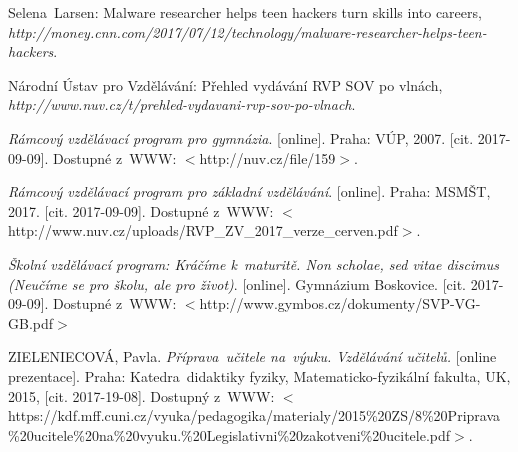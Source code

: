 \documentclass[a4paper, 12pt]{article}
\begin{document}
\newpage
\begin{thebibliography}{9}

    Selena~Larsen: Malware researcher helps teen hackers turn skills into careers,
    \\\textit{http://money.cnn.com/2017/07/12/technology/malware-researcher-helps-teen-hackers}.

    Národní Ústav pro Vzdělávání: Přehled vydávání RVP SOV po vlnách,
    \\\textit{http://www.nuv.cz/t/prehled-vydavani-rvp-sov-po-vlnach}.

    \textit{Rámcový vzdělávací program pro gymnázia}. [online]. Praha: VÚP, 2007. [cit. 2017-09-09]. Dostupné z~WWW: $<$http://nuv.cz/file/159$>$.

    \textit{Rámcový vzdělávací program pro základní vzdělávání}. [online]. Praha: MSMŠT, 2017. [cit. 2017-09-09]. Dostupné z~WWW: $<$http://www.nuv.cz/uploads/RVP\_ZV\_2017\_verze\_cerven.pdf$>$.

    \textit{Školní vzdělávací program: Kráčíme k~maturitě. Non scholae, sed vitae discimus (Neučíme se pro školu, ale pro život)}. [online]. Gymnázium Boskovice. [cit. 2017-09-09]. Dostupné z~WWW: $<$http://www.gymbos.cz/dokumenty/SVP-VG-GB.pdf$>$


    ZIELENIECOVÁ, Pavla. \textit{Příprava~učitele na~výuku. Vzdělávání učitelů.} [online prezentace]. Praha: Katedra~didaktiky fyziky, Matematicko-fyzikální fakulta, UK, 2015, [cit. 2017-19-08]. Dostupný z~WWW: $<$https://kdf.mff.cuni.cz/vyuka/pedagogika/materialy/2015\%20ZS/8\%20Priprava\\\%20ucitele\%20na\%20vyuku.\%20Legislativni\%20zakotveni\%20ucitele.pdf$>$.

\end{thebibliography}
\end{document}
